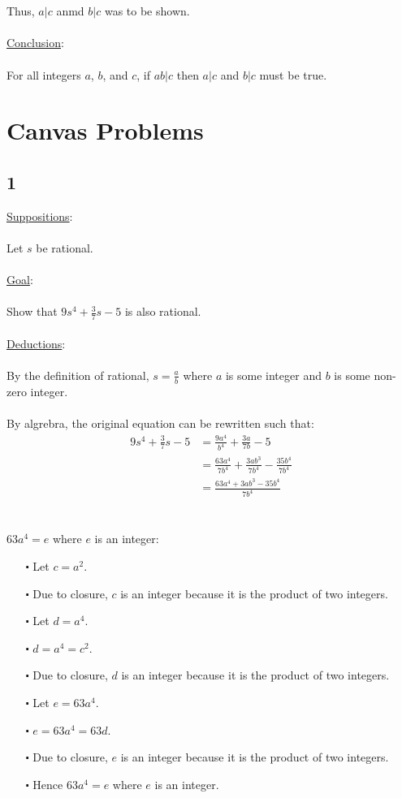 \documentclass[12pt]{article}
\begin{document}
\newblock
\\ \\
Thus, $a|c$ anmd $b|c$ was to be shown.
\\ \\
\underline{Conclusion}:
\\ \\
For all integers $a$, $b$, and $c$, if $ab|c$ then $a|c$ and $b|c$ must be true.
\section*{Canvas Problems}

\subsection*{1}
\underline{Suppositions}:
\\ \\
Let $s$ be rational.
\\ \\
\underline{Goal}:
\\ \\
Show that $9s^4 + \frac{3}{7}s -5$ is also rational. 
\\ \\
\underline{Deductions}:
\\ \\
By the definition of rational, $s = \frac{a}{b}$ where $a$ is some integer and $b$ is some non-zero integer.
\\ \\
By algrebra, the original equation can be rewritten such that:
\begin{align*}
  9s^4 + \frac{3}{7}s -5 &= \frac{9a^4}{b^4} + \frac{3a}{7b} - 5 \\
  &= \frac{63a^4}{7b^4} + \frac{3ab^3}{7b^4} - \frac{35b^4}{7b^4} \\
  &= \frac{63a^4 + 3ab^3 - 35b^4}{7b^4}
\end{align*}
\newblock
\\ \\
$63a^4 = e$ where $e$ is an integer:
\begin{itemize}
  \item [$\centerdot$] Let $c = a^2$. 
  \item [$\centerdot$] Due to closure, $c$ is an integer because it is the product of two integers.
  \item [$\centerdot$] Let $d = a^4$.
  \item [$\centerdot$] $d = a^4 = c^2$. 
  \item [$\centerdot$] Due to closure, $d$ is an integer because it is the product of two integers.
  \item [$\centerdot$] Let $e = 63a^4$.
  \item [$\centerdot$] $e = 63a^4 = 63d$.
  \item [$\centerdot$] Due to closure, $e$ is an integer because it is the product of two integers.
  \item [$\centerdot$] Hence $63a^4 = e$ where $e$ is an integer.
\end{itemize}
\end{document}
